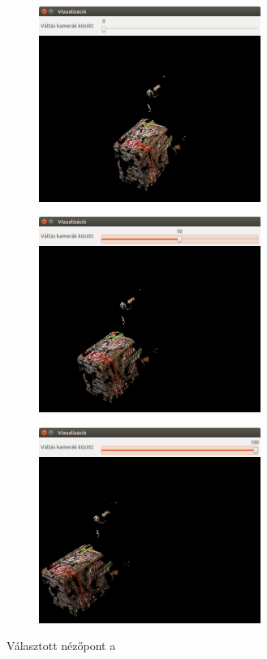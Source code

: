 \begin{figure}[tbh]
\centering
\begin{subfigure}[b]{.49\linewidth}
	\centering
	\includegraphics[width=205pt]{figures/visu_pixels_left.png}
	\caption{}
  \end{subfigure}
\begin{subfigure}[b]{.49\linewidth}
	\centering
	\includegraphics[width=205pt]{figures/visu_pixels_center.png}
	\caption{}
  \end{subfigure}
\begin{subfigure}[b]{.49\linewidth}
	\centering
	\includegraphics[width=205pt]{figures/visu_pixels_right.png}
	\caption{}
  \end{subfigure}
\caption{Választott nézőpont a \label{fig:visu_slider}}
\end{figure}

